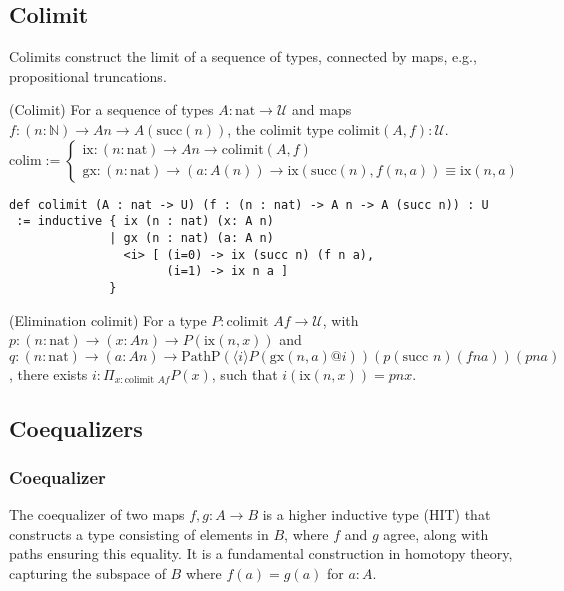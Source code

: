 \newpage
\subsection{Colimit}
Colimits construct the limit of a sequence of types, connected by maps,
e.g., propositional truncations.

\begin{definition} (Colimit)
For a sequence of types \( A : \text{nat} \to \mathcal{U} \) and
maps \( f : (n : \mathbb{N}) \to A n \to A(\text{succ}(n)) \),
the colimit type \( \text{colimit}(A,f) : \mathcal{U} \).
\[
\text{colim} :=
\begin{cases}
\text{ix} : (n : \text{nat}) \to A n \to \text{colimit}(A,f) \\
\text{gx} : (n : \text{nat}) \to (a : A(n)) \to \text{ix} (\text{succ}(n),f(n,a)) \equiv \text{ix}(n,a)
\end{cases}
\]
\begin{lstlisting}
def colimit (A : nat -> U) (f : (n : nat) -> A n -> A (succ n)) : U
 := inductive { ix (n : nat) (x: A n)
              | gx (n : nat) (a: A n)
                <i> [ (i=0) -> ix (succ n) (f n a),
                      (i=1) -> ix n a ]
              }
\end{lstlisting}
\end{definition}

\begin{theorem} (Elimination \( \text{colimit} \))
For a type \( P : \text{colimit } A f \to \mathcal{U} \),
with \( p : (n : \text{nat}) \to (x : A n) \to P(\text{ix}(n, x)) \)
and \( q : (n : \text{nat}) \to (a : A n) \to \text{PathP} (\langle i \rangle P(\text{gx}(n, a) @ i)) (p (\text{succ } n) (f n a)) (p n a) \),
there exists \( i : \Pi_{x:\text{colimit } A f} P(x) \), such that \( i(\text{ix}(n, x)) = p n x \).
\end{theorem}

\newpage
\subsection{Coequalizers}
\subsubsection*{Coequalizer}
The coequalizer of two maps \( f, g : A \to B \) is a higher inductive
type (HIT) that constructs a type consisting of elements in \( B \),
where \( f \) and \( g \) agree, along with paths ensuring this equality.
It is a fundamental construction in homotopy theory,
capturing the subspace of \( B \) where \( f(a) = g(a) \) for \( a : A \).

